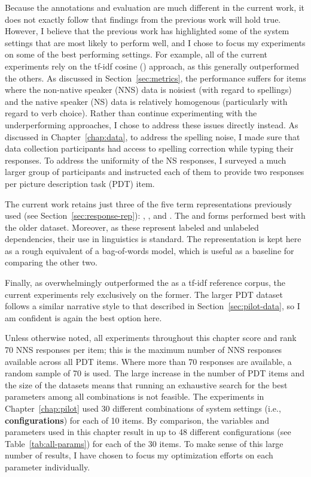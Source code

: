 Because the annotations and evaluation are much different in the current work, it does not exactly follow that findings from the previous work will hold true. However, I believe that the previous work has highlighted some of the system settings that are most likely to perform well, and I chose to focus my experiments on some of the best performing settings. For example, all of the current experiments rely on the tf-idf cosine () approach, as this generally outperformed the others. As discussed in Section~\ref{sec:metrics}, the  performance suffers for items where the non-native speaker (NNS) data is noisiest (with regard to spellings) and the native speaker (NS) data is relatively homogenous (particularly with regard to verb choice). Rather than continue experimenting with the underperforming approaches, I chose to address these issues directly instead. As discussed in Chapter~\ref{chap:data}, to address the spelling noise, I made sure that data collection participants had access to spelling correction while typing their responses. To address the uniformity of the NS responses, I surveyed a much larger group of participants and instructed each of them to provide two responses per picture description task (PDT) item.

The current work retains just three of the five term representations previously used (see Section~\ref{sec:response-rep}): , , and . The  and  forms performed best with the older dataset. Moreover, as these represent labeled and unlabeled dependencies, their use in linguistics is standard. The  representation is kept here as a rough equivalent of a bag-of-words model, which is useful as a baseline for comparing the other two.

Finally, as  overwhelmingly outperformed the  as a tf-idf reference corpus, the current experiments rely exclusively on the former. The larger PDT dataset follows a similar narrative style to that described in Section~\ref{sec:pilot-data}, so I am confident  is again the best option here.

Unless otherwise noted, all experiments throughout this chapter score and rank 70 NNS responses per item; this is the maximum number of NNS responses available across all PDT items. Where more than 70 responses are available, a random sample of 70 is used. The large increase in the number of PDT items and the size of the datasets means that running an exhaustive search for the best parameters among all combinations is not feasible. The experiments in Chapter~\ref{chap:pilot} used 30 different combinations of system settings (i.e., \textbf{configurations}) for each of 10 items. By comparison, the variables and parameters used in this chapter result in up to 48 different configurations (see Table~\ref{tab:all-params}) for each of the 30 items. To make sense of this large number of results, I have chosen to focus my optimization efforts on each parameter individually.


